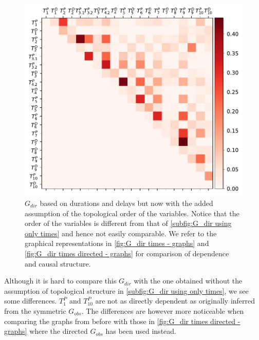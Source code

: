 \documentclass[../Thesis.tex]{subfiles}
\begin{document}
\begin{figure}[H]
    \centering
    \includegraphics[width = .8\linewidth]{figures/Cycle data/G_dir times - directed.pdf}
    \caption{$G_{dir}$ based on durations and delays but now with the added assumption of the topological order of the variables. Notice that the order of the variables is different from that of \autoref{subfig:G_dir using only times} and hence not easily comparable. We refer to the graphical representations in \autoref{fig:G_dir times - graphs} and \autoref{fig:G_dir times directed - graphs} for comparison of dependence and causal structure.}
    \label{fig:G_dir times - directed}
\end{figure}
Although it is hard to compare this $G_{dir}$ with the one obtained without the assumption of topological structure in \autoref{subfig:G_dir using only times}, we see some differences. $T^P_1$ and $T^P_{10}$ are not as directly dependent as originally inferred from the symmetric $G_{obs}$. The differences are however more noticeable when comparing the graphs from before with those in \autoref{fig:G_dir times directed - graphs} where the directed $G_{obs}$ has been used instead.
\end{document}
